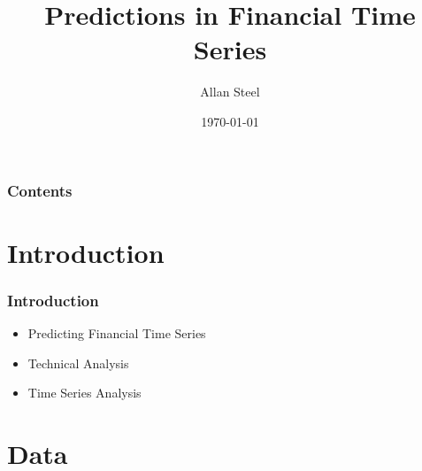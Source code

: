 \documentclass{beamer}
\title[Predictions in Financial Time Series]{Predictions in Financial Time Series} %
\author{Allan Steel} %
\institute[ITB] %
{
Institute of Technology Blanchardstown \\ %
\medskip
\textit{allan@allansteel.com} %
}
\date{\today} %
\begin{document}
\begin{frame}
\titlepage %
\end{frame}

\begin{frame}
\frametitle{Contents} %
\tableofcontents %
\end{frame}


\section{Introduction} %


\begin{frame}
\frametitle{Introduction}
\begin{itemize}
\item Predicting Financial Time Series
\item Technical Analysis
\item Time Series Analysis
\end{itemize}

\end{frame}


\section{Data} %
\end{document}
